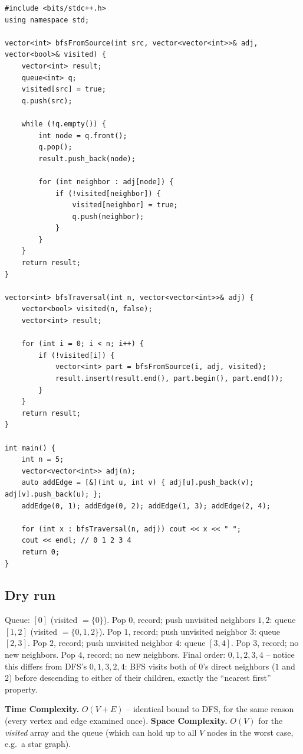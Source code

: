 \begin{lstlisting}
#include <bits/stdc++.h>
using namespace std;

vector<int> bfsFromSource(int src, vector<vector<int>>& adj, vector<bool>& visited) {
    vector<int> result;
    queue<int> q;
    visited[src] = true;
    q.push(src);

    while (!q.empty()) {
        int node = q.front();
        q.pop();
        result.push_back(node);

        for (int neighbor : adj[node]) {
            if (!visited[neighbor]) {
                visited[neighbor] = true;
                q.push(neighbor);
            }
        }
    }
    return result;
}

vector<int> bfsTraversal(int n, vector<vector<int>>& adj) {
    vector<bool> visited(n, false);
    vector<int> result;

    for (int i = 0; i < n; i++) {
        if (!visited[i]) {
            vector<int> part = bfsFromSource(i, adj, visited);
            result.insert(result.end(), part.begin(), part.end());
        }
    }
    return result;
}

int main() {
    int n = 5;
    vector<vector<int>> adj(n);
    auto addEdge = [&](int u, int v) { adj[u].push_back(v); adj[v].push_back(u); };
    addEdge(0, 1); addEdge(0, 2); addEdge(1, 3); addEdge(2, 4);

    for (int x : bfsTraversal(n, adj)) cout << x << " ";
    cout << endl; // 0 1 2 3 4
    return 0;
}
\end{lstlisting}

\subsection*{Dry run}


Queue: $[0]$ (visited $=\{0\}$). Pop $0$, record; push unvisited
neighbors $1,2$: queue $[1,2]$ (visited $=\{0,1,2\}$). Pop $1$,
record; push unvisited neighbor $3$: queue $[2,3]$. Pop $2$, record;
push unvisited neighbor $4$: queue $[3,4]$. Pop $3$, record; no new
neighbors. Pop $4$, record; no new neighbors. Final order:
$0,1,2,3,4$ -- notice this differs from DFS's $0,1,3,2,4$: BFS visits
both of $0$'s direct neighbors ($1$ and $2$) before descending to
either of their children, exactly the ``nearest first'' property.

\begin{complexitybox}
\textbf{Time Complexity.} $O(V+E)$ -- identical bound to DFS, for the
same reason (every vertex and edge examined once).
\textbf{Space Complexity.} $O(V)$ for the \textit{visited} array and
the queue (which can hold up to all $V$ nodes in the worst case, e.g.\
a star graph).
\end{complexitybox}


